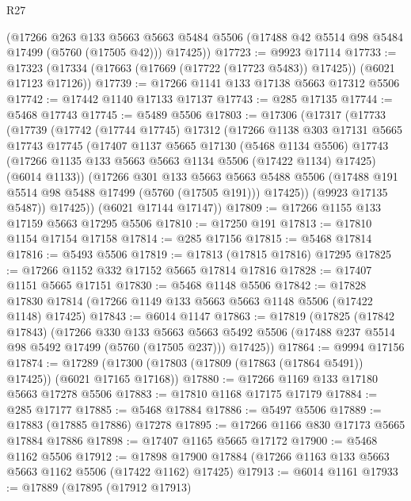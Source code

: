 \begin{lexlean}{R27}
\begin{coremodule}
      (@17266
        @263
        @133
        @5663
        @5663
        @5484
        @5506
        (@17488 @42 @5514 @98 @5484 @17499 (@5760 (@17505 @42)))
        @17425))
@17723 := @9923 @17114
@17733 := @17323 (@17334 (@17663 (@17669 (@17722 (@17723 @5483)) @17425)) (@6021 @17123 @17126))
@17739 := @17266 @1141 @133 @17138 @5663 @17312 @5506
@17742 := @17442 @1140 @17133 @17137
@17743 := @285 @17135
@17744 := @5468 @17743
@17745 := @5489 @5506
@17803 := @17306
    (@17317
      (@17733
        (@17739
          (@17742
            (@17744 @17745)
            @17312
            (@17266
              @1138
              @303
              @17131
              @5665
              @17743
              @17745
              (@17407
                @1137
                @5665
                @17130
                (@5468 @1134 @5506)
                @17743
                (@17266 @1135 @133 @5663 @5663 @1134 @5506 (@17422 @1134) @17425)
                (@6014 @1133))
              (@17266
                @301
                @133
                @5663
                @5663
                @5488
                @5506
                (@17488 @191 @5514 @98 @5488 @17499 (@5760 (@17505 @191)))
                @17425))
            (@9923 @17135 @5487))
          @17425))
      (@6021 @17144 @17147))
@17809 := @17266 @1155 @133 @17159 @5663 @17295 @5506
@17810 := @17250 @191
@17813 := @17810 @1154 @17154 @17158
@17814 := @285 @17156
@17815 := @5468 @17814
@17816 := @5493 @5506
@17819 := @17813 (@17815 @17816) @17295
@17825 := @17266 @1152 @332 @17152 @5665 @17814 @17816
@17828 := @17407 @1151 @5665 @17151
@17830 := @5468 @1148 @5506
@17842 := @17828 @17830 @17814 (@17266 @1149 @133 @5663 @5663 @1148 @5506 (@17422 @1148) @17425)
@17843 := @6014 @1147
@17863 := @17819
    (@17825
      (@17842 @17843)
      (@17266
        @330
        @133
        @5663
        @5663
        @5492
        @5506
        (@17488 @237 @5514 @98 @5492 @17499 (@5760 (@17505 @237)))
        @17425))
@17864 := @9994 @17156
@17874 := @17289 (@17300 (@17803 (@17809 (@17863 (@17864 @5491)) @17425)) (@6021 @17165 @17168))
@17880 := @17266 @1169 @133 @17180 @5663 @17278 @5506
@17883 := @17810 @1168 @17175 @17179
@17884 := @285 @17177
@17885 := @5468 @17884
@17886 := @5497 @5506
@17889 := @17883 (@17885 @17886) @17278
@17895 := @17266 @1166 @830 @17173 @5665 @17884 @17886
@17898 := @17407 @1165 @5665 @17172
@17900 := @5468 @1162 @5506
@17912 := @17898 @17900 @17884 (@17266 @1163 @133 @5663 @5663 @1162 @5506 (@17422 @1162) @17425)
@17913 := @6014 @1161
@17933 := @17889
    (@17895
      (@17912 @17913)

\end{coremodule}
\end{lexlean}
